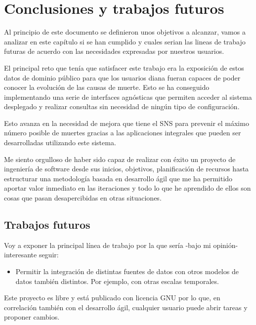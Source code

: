 \chapter{Conclusiones y trabajos futuros}
Al principio de este documento se definieron unos objetivos a alcanzar, vamos a analizar
en este capítulo si se han cumplido y cuales serian las lineas de trabajo futuras de
acuerdo con las necesidades expresadas por nuestros usuarios.

El principal reto que tenía que satisfacer este trabajo era la exposición de estos datos
de dominio público para que los usuarios diana fueran capaces de poder conocer la
evolución de las causas de muerte. Esto se ha conseguido implementando una serie de
interfaces agnósticas que permiten acceder al sistema desplegado y realizar consultas sin
necesidad de ningún tipo de configuración. 

Esto avanza en la necesidad de mejora que tiene el \Gls{SNS} para prevenir el máximo número
posible de muertes gracias a las aplicaciones integrales que pueden ser desarrolladas
utilizando este sistema.

Me siento orgulloso de haber sido capaz de realizar con éxito un proyecto de ingeniería de
software desde sus inicios, objetivos, planificación de recursos hasta estructurar una
metodología basada en desarrollo ágil que me ha permitido aportar valor inmediato en las
iteraciones y todo lo que he aprendido de ellos son cosas que pasan desapercibidas en otras situaciones.

\section{Trabajos futuros}
Voy a exponer la principal línea de trabajo por la que sería -bajo mi opinión- interesante seguir:
\begin{itemize}
    \item Permitir la integración de distintas fuentes de datos con otros modelos de datos
    también distintos. Por ejemplo, con otras escalas temporales.
\end{itemize}
Este proyecto es libre y está publicado con licencia GNU \cite{gplv3} por lo que, en
correlación también con el desarrollo ágil, cualquier usuario puede abrir tareas y
proponer cambios.